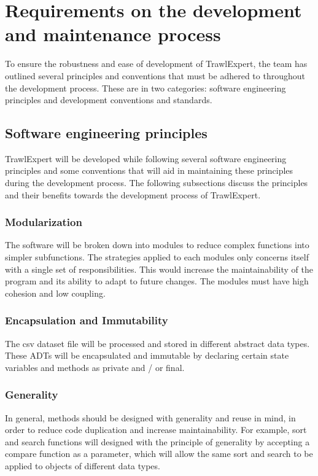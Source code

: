 \documentclass{article}
\begin{document}
\section{Requirements on the development and maintenance process}
To ensure the robustness and ease of development of TrawlExpert, the team has outlined several principles and conventions that must be adhered to throughout the development process. These are in two categories: software engineering principles and development conventions and standards.

\subsection{Software engineering principles}
TrawlExpert will be developed while following several software engineering principles and some conventions that will aid in maintaining these principles during the development process. The following subsections discuss the principles and their benefits towards the development process of TrawlExpert.

\subsubsection{Modularization}
The software will be broken down into modules to reduce complex functions into simpler subfunctions. The strategies applied to each modules only concerns itself with a single set of responsibilities. This would increase the maintainability of the program and its ability to adapt to future changes. The modules must have high cohesion and low coupling. 

\subsubsection{Encapsulation and Immutability}
The csv dataset file will be processed and stored in different abstract data types. These ADTs will be encapsulated and immutable by declaring certain state variables and methods as private and / or final.

\subsubsection{Generality}
In general, methods should be designed with generality and reuse in mind, in order to reduce code duplication and increase maintainability. For example, sort and search functions will designed with the principle of generality by accepting a compare function as a parameter, which will allow the same sort and search to be applied to objects of different data types.  
\end{document}
